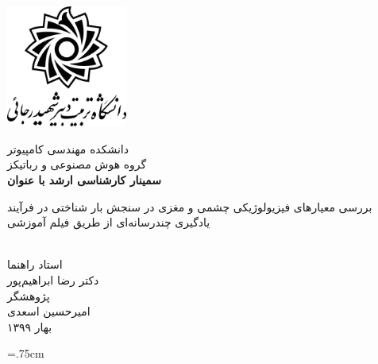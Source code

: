 \documentclass[12pt,a4paper]{article}
\begin{document}
	\thispagestyle{empty}
	\vspace*{-45mm}
	\centerline{\includegraphics[height=4cm]{figures/srulogofa.png}}
	\begin{center}
		
		\vspace{-3mm}
		دانشکده مهندسی کامپیوتر
		\\[.2cm]
		
		گروه هوش مصنوعی و رباتیکز
		\\[1cm]
		{\Large 
			\textbf{سمینار کارشناسی ارشد با عنوان}
		}
		\\[.4cm]
		\baselineskip=2cm
		{\titr
			\begin{huge}
				بررسی معیارهای فیزیولوژیکی چشمی و مغزی در سنجش بار شناختی در فرآیند یادگیری چندرسانه‌ای از طریق فیلم آموزشی
			\end{huge}
		}
		\\[1cm]
		{\Large
			{\traffic 
				استاد راهنما
			}
			\\[.7cm]
			{\Large \nastaliq دکتر رضا ابراهیم‌پور }
			\\[.7cm]
			{\Large\traffic  پژوهشگر
			}
		}
		\\[.6cm]
		{\Large \nastaliq امیرحسین اسعدی}
		\\[.2cm]
		بهار ۱۳۹۹
	\end{center}
\newpage
\baselineskip=1cm
\tableofcontents

\newpage
\listoftables

\newpage
\listoffigures

\newpage
\baselineskip=.75cm
\end{document}
